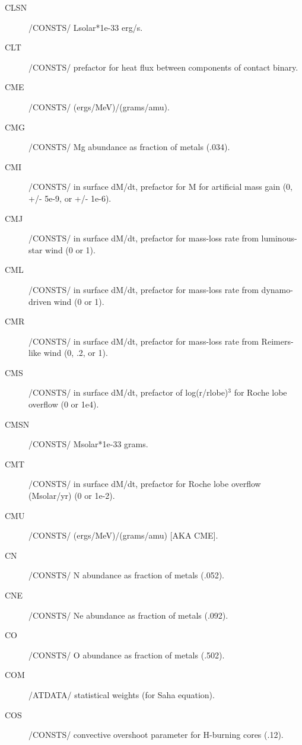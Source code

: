 \documentclass{article}
\begin{document}
\begin{description}
	\item[CLSN]		/CONSTS/ Lsolar*1e-33 erg/s.

	\item[CLT]		    /CONSTS/ prefactor for heat flux between components of contact binary.

	\item[CME]		    /CONSTS/ (ergs/MeV)/(grams/amu).

	\item[CMG]		    /CONSTS/ Mg abundance as fraction of metals (.034).

	\item[CMI]		    /CONSTS/ in surface dM/dt, prefactor for M for artificial mass gain (0, +/- 5e-9, or +/- 1e-6).

	\item[CMJ]		    /CONSTS/ in surface dM/dt, prefactor for mass-loss rate from luminous-star wind (0 or 1).

	\item[CML]		    /CONSTS/ in surface dM/dt, prefactor for mass-loss rate from dynamo-driven wind (0 or 1).

	\item[CMR]		    /CONSTS/ in surface dM/dt, prefactor for mass-loss rate from Reimers-like wind (0, .2, or 1).

	\item[CMS]		    /CONSTS/ in surface dM/dt, prefactor of log(r/rlobe)$^3$ for Roche lobe overflow (0 or 1e4).

	\item[CMSN]		/CONSTS/ Msolar*1e-33 grams.

	\item[CMT]		    /CONSTS/ in surface dM/dt, prefactor for Roche lobe overflow (Msolar/yr) (0 or 1e-2).

	\item[CMU]		    /CONSTS/ (ergs/MeV)/(grams/amu) [AKA CME].

	\item[CN]		    /CONSTS/ N abundance as fraction of metals (.052).

	\item[CNE	]	    /CONSTS/ Ne abundance as fraction of metals (.092).

	\item[CO]		    /CONSTS/ O abundance as fraction of metals (.502).

	\item[COM]     	/ATDATA/ statistical weights (for Saha equation).

	\item[COS]		    /CONSTS/ convective overshoot parameter for H-burning cores (.12).


\end{description}
\end{document}
